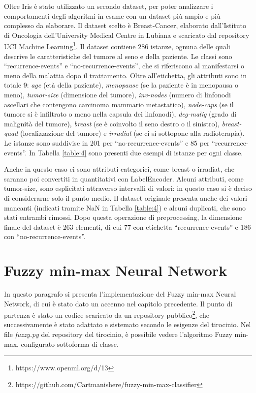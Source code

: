 \documentclass[11pt,  oneside, openany]{book}
\begin{document}
Oltre Iris è stato utilizzato un secondo dataset, per poter analizzare i comportamenti degli algoritmi in esame con un dataset più ampio e più complesso da elaborare. Il dataset scelto è Breast-Cancer, elaborato dall'Istituto di Oncologia dell'University Medical Centre in Lubiana e scaricato dal repository UCI Machine Learning\footnote{https://www.openml.org/d/13}. Il dataset contiene 286 istanze, ognuna delle quali descrive le caratteristiche del tumore al seno e della paziente. Le classi sono ``recurrence-events'' e ``no-recurrence-events'', che si riferiscono al manifestarsi o meno della malattia dopo il trattamento. Oltre all'etichetta, gli attributi sono in totale 9: \textit{age} (età della paziente), \textit{menopause} (se la paziente è in menopausa o meno), \textit{tumor-size} (dimensione del tumore), \textit{inv-nodes} (numero di linfonodi ascellari che contengono carcinoma mammario metastatico), \textit{node-caps} (se il tumore si è infiltrato o meno nella capsula dei linfonodi), \textit{deg-malig} (grado di malignità del tumore), \textit{breast} (se è coinvolto il seno destro o il sinistro), \textit{breast-quad} (localizzazione del tumore) e \textit{irradiat} (se ci si sottopone alla radioterapia). Le istanze sono suddivise in 201 per ``no-recurrence-events'' e 85 per ``recurrence-events''. In Tabella \ref{table:4} sono presenti due esempi di istanze per ogni classe. 

Anche in questo caso ci sono attributi categorici, come breast o irradiat, che saranno poi convertiti in quantitativi con LabelEncoder. Alcuni attributi, come tumor-size, sono esplicitati attraverso intervalli di valori: in questo caso si è deciso di considerarne solo il punto medio. Il dataset originale presenta anche dei valori mancanti (indicati tramite NaN in Tabella \ref{table:4}) e alcuni duplicati, che sono stati entrambi rimossi. Dopo questa operazione di preprocessing, la dimensione finale del dataset  è 263 elementi, di cui 77 con etichetta ``recurrence-events'' e 186 con ``no-recurrence-events''. 


	\section{Fuzzy min-max Neural Network}
In questo paragrafo si presenta l'implementazione del Fuzzy min-max Neural Network, di cui è stato dato un accenno nel capitolo precedente. Il punto di partenza è stato un codice scaricato da un repository pubblico\footnote{https://github.com/Cartmanishere/fuzzy-min-max-classifier}, che successivamente è stato adattato e sistemato secondo le esigenze del tirocinio. Nel file \textit{fuzzy.py} del repository del tirocinio, è possibile vedere l'algoritmo Fuzzy min-max, configurato sottoforma di classe. 
\end{document}
